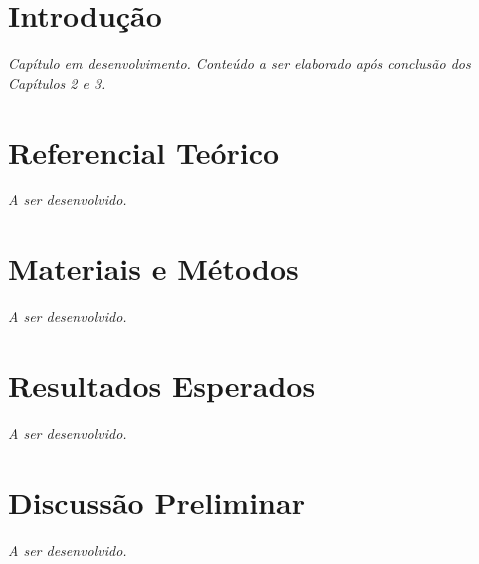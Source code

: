 \newpage

\section{Introdução}




\textit{Capítulo em desenvolvimento. Conteúdo a ser elaborado após conclusão dos Capítulos 2 e 3.}


\section{Referencial Teórico}

\textit{A ser desenvolvido.}


\section{Materiais e Métodos}

\textit{A ser desenvolvido.}


\section{Resultados Esperados}

\textit{A ser desenvolvido.}


\section{Discussão Preliminar}

\textit{A ser desenvolvido.}

